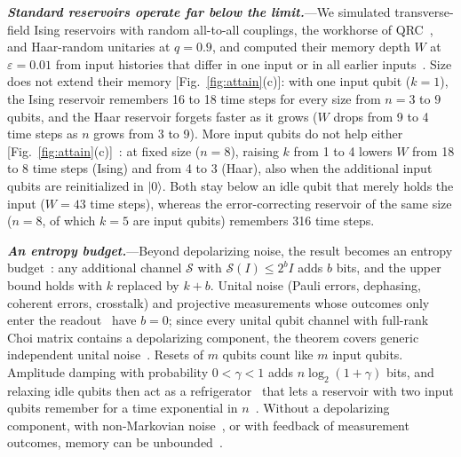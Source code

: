 \documentclass[aps,prl,twocolumn,superscriptaddress,floatfix]{revtex4-2}
\theoremstyle{plain}
\newcommand{\ket}[1]{|#1\rangle}
\newcommand{\runin}[1]{\textit{\textbf{#1}}---}
\begin{document}
\runin{Standard reservoirs operate far below the limit.}We simulated transverse-field Ising reservoirs with random all-to-all couplings, the workhorse of QRC~\cite{Fujii2017,Nakajima2019,MartinezPena2021}, and Haar-random unitaries at $q=0.9$, and computed their memory depth $W$ at $\varepsilon=0.01$ from input histories that differ in one input or in all earlier inputs~\cite{SM}. Size does not extend their memory [Fig.~\ref{fig:attain}(c)]: with one input qubit ($k=1$), the Ising reservoir remembers 16 to 18 time steps for every size from $n=3$ to $9$ qubits, and the Haar reservoir forgets faster as it grows ($W$ drops from 9 to 4 time steps as $n$ grows from 3 to 9). More input qubits do not help either [Fig.~\ref{fig:attain}(c)]~\cite{SM}: at fixed size ($n=8$), raising $k$ from 1 to 4 lowers $W$ from 18 to 8 time steps (Ising) and from 4 to 3 (Haar), also when the additional input qubits are reinitialized in $\ket0$. Both stay below an idle qubit that merely holds the input ($W=43$ time steps), whereas the error-correcting reservoir of the same size ($n=8$, of which $k=5$ are input qubits) remembers 316 time steps.

\runin{An entropy budget.}Beyond depolarizing noise, the result becomes an entropy budget~\cite{SM}: any additional channel $\mathcal S$ with $\mathcal S(I)\le2^bI$ adds $b$ bits, and the upper bound holds with $k$ replaced by $k+b$. Unital noise (Pauli errors, dephasing, coherent errors, crosstalk) and projective measurements whose outcomes only enter the readout~\cite{Mujal2023} have $b=0$; since every unital qubit channel with full-rank Choi matrix contains a depolarizing component, the theorem covers generic independent unital noise~\cite{SM}. Resets of $m$ qubits count like $m$ input qubits. Amplitude damping with probability $0<\gamma<1$ adds $n\log_2(1+\gamma)$ bits, and relaxing idle qubits then act as a refrigerator~\cite{BenOr2013} that lets a reservoir with two input qubits remember for a time exponential in $n$~\cite{SM,Hoeffding1963}. Without a depolarizing component, with non-Markovian noise~\cite{Sannia2026}, or with feedback of measurement outcomes, memory can be unbounded~\cite{SM}.
\end{document}
